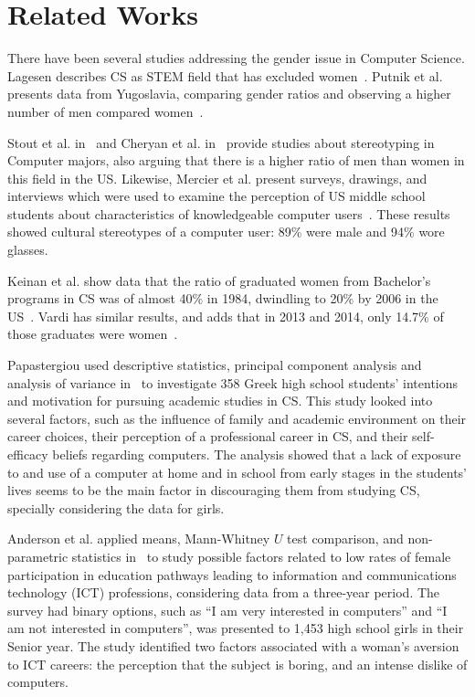 \section{Related Works}\label{sec:related}%
There have been several studies addressing the gender issue in Computer Science. Lagesen describes CS as STEM field that has excluded women~\cite{vivian_2007}. Putnik et al. presents data from Yugoslavia, comparing gender ratios and observing a higher number of men compared women~\cite{zoran_2017}.

Stout et al. in~\cite{jane_2016} and Cheryan et al. in~\cite{sappa_2013} provide studies about stereotyping in Computer majors, also arguing that there is a higher ratio of men than women in this field in the US. Likewise, Mercier et al. present surveys, drawings, and interviews which were used to examine the perception of US middle school students about characteristics of knowledgeable computer users~\cite{Mercier_2006}. These results showed cultural stereotypes of a computer user: 89\% were male and 94\% wore glasses.

Keinan et al. show data that the ratio of graduated women from Bachelor's programs in CS was of almost 40\% in 1984, dwindling to 20\% by 2006 in the US~\cite{keinan_2017}. Vardi has similar results, and adds that in 2013 and 2014, only 14.7\% of those graduates were women~\cite{moshe_2015}.

Papastergiou used descriptive statistics, principal component analysis and analysis of variance in~\cite{papastergiou_are_2008} to investigate 358 Greek high school students' intentions and motivation for pursuing academic studies in CS. This study looked into several factors, such as the influence of family and academic environment on their career choices, their perception of a professional career in CS, and their self-efficacy beliefs regarding computers. The analysis showed that a lack of exposure to and use of a computer at home and in school from early stages in the students' lives seems to be the main factor in discouraging them from studying CS, specially considering the data for girls.

Anderson et al. applied means, \mbox{Mann-Whitney} $U$ test comparison, and non-parametric statistics in~\cite{anderson_because_2008} to study possible factors related to low rates of female participation in education pathways leading to information and communications technology (ICT) professions, considering data from a three-year period. The survey had binary options, such as ``I am very interested in computers'' and ``I am not interested in computers'', was presented to 1,453 high school girls in their Senior year. The study identified two factors associated with a woman's aversion to ICT careers: the perception that the subject is boring, and an intense dislike of computers.


